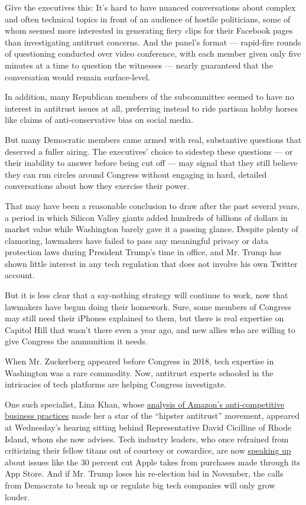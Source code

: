 Give the executives this: It's hard to have nuanced conversations about
complex and often technical topics in front of an audience of hostile
politicians, some of whom seemed more interested in generating fiery
clips for their Facebook pages than investigating antitrust concerns.
And the panel's format --- rapid-fire rounds of questioning conducted
over video conference, with each member given only five minutes at a
time to question the witnesses --- nearly guaranteed that the
conversation would remain surface-level.

In addition, many Republican members of the subcommittee seemed to have
no interest in antitrust issues at all, preferring instead to ride
partisan hobby horses like claims of anti-conservative bias on social
media.

But many Democratic members came armed with real, substantive questions
that deserved a fuller airing. The executives' choice to sidestep these
questions --- or their inability to answer before being cut off --- may
signal that they still believe they can run circles around Congress
without engaging in hard, detailed conversations about how they exercise
their power.

That may have been a reasonable conclusion to draw after the past
several years, a period in which Silicon Valley giants added hundreds of
billions of dollars in market value while Washington barely gave it a
passing glance. Despite plenty of clamoring, lawmakers have failed to
pass any meaningful privacy or data protection laws during President
Trump's time in office, and Mr. Trump has shown little interest in any
tech regulation that does not involve his own Twitter account.

But it is less clear that a say-nothing strategy will continue to work,
now that lawmakers have begun doing their homework. Sure, some members
of Congress may still need their iPhones explained to them, but there is
real expertise on Capitol Hill that wasn't there even a year ago, and
new allies who are willing to give Congress the ammunition it needs.

When Mr. Zuckerberg appeared before Congress in 2018, tech expertise in
Washington was a rare commodity. Now, antitrust experts schooled in the
intricacies of tech platforms are helping Congress investigate.

One such specialist, Lina Khan, whose
\href{https://www.nytimes.com/2018/09/07/technology/monopoly-antitrust-lina-khan-amazon.html}{analysis
of Amazon's anti-competitive business practices} made her a star of the
``hipster antitrust'' movement, appeared at Wednesday's hearing sitting
behind Representative David Cicilline of Rhode Island, whom she now
advises. Tech industry leaders, who once refrained from criticizing
their fellow titans out of courtesy or cowardice, are now
\href{https://gamerant.com/epic-games-ceo-tim-sweeney-criticizes-apples-app-store-fees/}{speaking
up} about issues like the 30 percent cut Apple takes from purchases made
through its App Store. And if Mr. Trump loses his re-election bid in
November, the calls from Democrats to break up or regulate big tech
companies will only grow louder.

